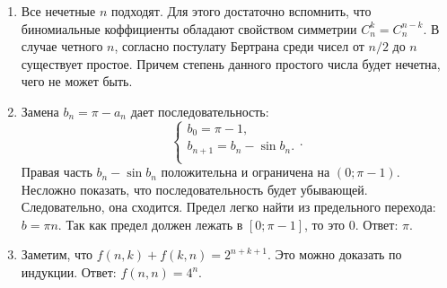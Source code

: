 \documentclass[11pt, a4paper]{article}
\begin{document}
\begin{enumerate}
\item Все нечетные $n$ подходят. Для этого достаточно вспомнить, что биномиальные коффициенты обладают свойством симметрии $C_{n}^k = C_{n}^{n-k}$. В случае четного $n$, согласно постулату Бертрана среди чисел от $n/2$ до $n$ существует простое. Причем степень данного простого числа будет нечетна, чего не может быть.

\item Замена $b_n = \pi - a_n$ дает последовательность: 
$$
\begin{cases}
b_0 = \pi - 1,\\
b_{n+1} = b_n - \sin{b_n}.\\
\end{cases}. 
$$
Правая часть $b_n - \sin{b_n}$ положительна и ограничена на $(0; \pi - 1)$. Несложно показать, что последовательность будет убывающей. Следовательно, она сходится. Предел легко найти из предельного перехода: $b = \pi n$. Так как предел должен лежать в $[0; \pi - 1]$, то это 0. Ответ: $\pi$.

\item Заметим, что $f(n, k) + f(k, n) = 2^{n + k + 1}$. Это можно доказать по индукции. Ответ: $f(n, n) = 4^n$.
\end{enumerate}
\end{document}
